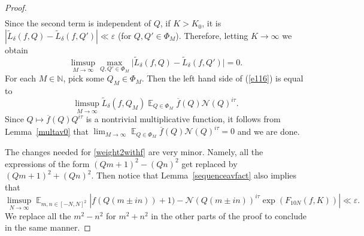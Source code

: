 \documentclass[11pt]{amsart}
\theoremstyle{definition}
\DeclareMathOperator*{\E}{\mathbb{E}}
\newcommand{\N}{{\mathbb N}}
\newcommand{\NN}{{\mathcal N}}
\begin{document}
\begin{proof}
\begin{equation}
\begin{split}
    \end{split}
\end{equation}
Since the second term is independent of $Q$, if $K>K_0$, it is $|\tilde{L}_{\delta}(f,Q)-\tilde{L}_{\delta}(f,Q')|\ll \varepsilon$ (for $Q, Q' \in \Phi_M$). Therefore, letting $K \to \infty$ we obtain
$$\limsup_{M\to\infty}\max_{Q,Q'\in\Phi_{M}}\vert\tilde{L}_{\delta}(f,Q)-\tilde{L}_{\delta}(f,Q')\vert=0.$$
For each $M\in\N$, pick some $Q_{M}\in\Phi_{M}$. Then
the left hand side of (\ref{e116}) is equal to
$$\limsup_{M\to\infty}\tilde{L}_{\delta}(f,Q_{M})\E_{Q\in\Phi_{M}}\overline{f}(Q)\NN(Q)^{i\tau}.$$
Since $Q\mapsto \overline{f}(Q)Q^{i\tau}$ is a nontrivial multiplicative function, it follows from Lemma~\ref{multav0} that $\lim_{M \to \infty} \E_{Q\in\Phi_{M}}\overline{f}(Q)\NN(Q)^{i\tau}=0$ and we are done.

The changes needed for \eqref{weight2withf} are very minor. Namely, all the expressions of the form $(Qm+1)^2-(Qn)^2$ get replaced by $(Qm+1)^2+(Qn)^2$. Then notice that Lemma~\ref{sequenceavfact} also implies that 
\[
\limsup_{N\to\infty}\E_{m,n\in [-N,N]^{2}}\left| f(Q(m\pm in))+1)-\NN(Q(m\pm in))^{i\tau}\exp(F_{10N}(f,K))\right|\ll\varepsilon.
\]
We replace all the $m^2-n^2$ for $m^2+n^2$ in the other parts of the proof to conclude in the same manner.
\end{proof}
\end{document}

